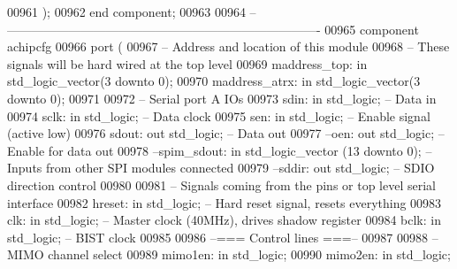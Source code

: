 \begin{DoxyCode}
00961     );
00962 \textcolor{keywordflow}{end} \textcolor{keywordflow}{component};
00963 
00964 \textcolor{keyword}{-- ----------------------------------------------------------------------------}
00965 \textcolor{keywordflow}{component} achipcfg
00966     \textcolor{keywordflow}{port} (
00967 \textcolor{keyword}{        -- Address and location of this module}
00968 \textcolor{keyword}{        -- These signals will be hard wired at the top level}
00969         maddress\_top:   \textcolor{keywordflow}{in} \textcolor{comment}{std\_logic\_vector}(\textcolor{vhdllogic}{}\textcolor{vhdllogic}{3} \textcolor{keywordflow}{downto} \textcolor{vhdllogic}{}\textcolor{vhdllogic}{0});
00970         maddress\_atrx:  \textcolor{keywordflow}{in} \textcolor{comment}{std\_logic\_vector}(\textcolor{vhdllogic}{}\textcolor{vhdllogic}{3} \textcolor{keywordflow}{downto} \textcolor{vhdllogic}{}\textcolor{vhdllogic}{0});
00971     
00972 \textcolor{keyword}{        -- Serial port A IOs}
00973         sdin:   \textcolor{keywordflow}{in} \textcolor{comment}{std\_logic};   \textcolor{keyword}{-- Data in}
00974         sclk:   \textcolor{keywordflow}{in} \textcolor{comment}{std\_logic};   \textcolor{keyword}{-- Data clock}
00975         sen:    \textcolor{keywordflow}{in} \textcolor{comment}{std\_logic};   \textcolor{keyword}{-- Enable signal (active low)}
00976         sdout:  \textcolor{keywordflow}{out} \textcolor{comment}{std\_logic};  \textcolor{keyword}{-- Data out}
00977 \textcolor{keyword}{        --oen:  out std\_logic;          -- Enable for data out}
00978 \textcolor{keyword}{        --spim\_sdout:   in std\_logic\_vector (13 downto 0);  --Inputs from other SPI modules connected}
00979 \textcolor{keyword}{        --sddir:    out std\_logic;  -- SDIO direction control}
00980     
00981 \textcolor{keyword}{        -- Signals coming from the pins or top level serial interface}
00982         hreset: \textcolor{keywordflow}{in} \textcolor{comment}{std\_logic};   \textcolor{keyword}{-- Hard reset signal, resets everything}
00983         clk:    \textcolor{keywordflow}{in} \textcolor{comment}{std\_logic};   \textcolor{keyword}{-- Master clock (40MHz), drives shadow register}
00984         bclk:   \textcolor{keywordflow}{in} \textcolor{comment}{std\_logic};   \textcolor{keyword}{-- BIST clock}
00985         
00986 \textcolor{keyword}{        --=== Control lines ===--}
00987         
00988 \textcolor{keyword}{        -- MIMO channel select}
00989         mimo1en:    \textcolor{keywordflow}{in} \textcolor{comment}{std\_logic};
00990         mimo2en:    \textcolor{keywordflow}{in} \textcolor{comment}{std\_logic};

\end{DoxyCode}
